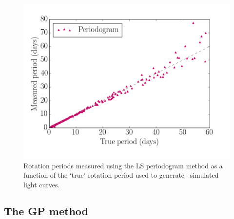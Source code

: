 \begin{figure}
\begin{center}
\includegraphics[width=6in, clip=true]{figures/compare_pgram.pdf}
\caption[LS periodogram results.]
{Rotation periods measured using the LS periodogram method as a
function of the `true' rotation period used to generate \nlightcurves\
simulated light curves.}
\end{center}
\end{figure}
\label{fig:pgram_compare_noise_free}

\subsection{The GP method}

